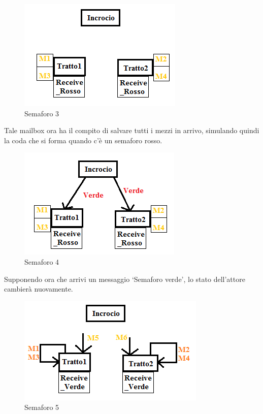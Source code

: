 \documentclass{article}
\begin{document}
\begin{figure}[H]
\begin{center}
\includegraphics{./img/Semaforo3.png}
\caption{Semaforo 3}
\label{fig:Semaforo 3}
\end{center}
\end{figure}
Tale mailbox ora ha il compito di salvare tutti i mezzi in arrivo, simulando quindi la coda che si forma quando c\textquoteright{}\`{e} un semaforo rosso.
\begin{figure}[H]
\begin{center}
\includegraphics{./img/Semaforo4.png}
\caption{Semaforo 4}
\label{fig:Semaforo 4}
\end{center}
\end{figure}
Supponendo ora che arrivi un messaggio \lq Semaforo verde\rq, lo stato dell\textquoteright{}attore cambier\`{a} nuovamente.
\begin{figure}[H]
\begin{center}
\includegraphics{./img/Semaforo5.png}
\caption{Semaforo 5}
\label{fig:Semaforo 5}
\end{center}
\end{figure}
\end{document}
